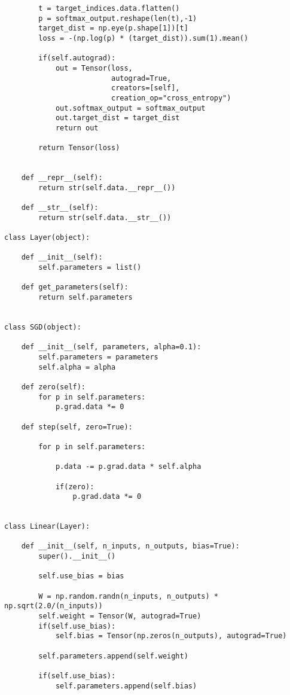 \documentclass[12pt]{article}
\begin{document}
\begin{verbatim}
        t = target_indices.data.flatten()
        p = softmax_output.reshape(len(t),-1)
        target_dist = np.eye(p.shape[1])[t]
        loss = -(np.log(p) * (target_dist)).sum(1).mean()
    
        if(self.autograd):
            out = Tensor(loss,
                         autograd=True,
                         creators=[self],
                         creation_op="cross_entropy")
            out.softmax_output = softmax_output
            out.target_dist = target_dist
            return out

        return Tensor(loss)
        
    
    def __repr__(self):
        return str(self.data.__repr__())
    
    def __str__(self):
        return str(self.data.__str__())  

class Layer(object):
    
    def __init__(self):
        self.parameters = list()
        
    def get_parameters(self):
        return self.parameters

    
class SGD(object):
    
    def __init__(self, parameters, alpha=0.1):
        self.parameters = parameters
        self.alpha = alpha
    
    def zero(self):
        for p in self.parameters:
            p.grad.data *= 0
        
    def step(self, zero=True):
        
        for p in self.parameters:
            
            p.data -= p.grad.data * self.alpha
            
            if(zero):
                p.grad.data *= 0


class Linear(Layer):

    def __init__(self, n_inputs, n_outputs, bias=True):
        super().__init__()
        
        self.use_bias = bias
        
        W = np.random.randn(n_inputs, n_outputs) * np.sqrt(2.0/(n_inputs))
        self.weight = Tensor(W, autograd=True)
        if(self.use_bias):
            self.bias = Tensor(np.zeros(n_outputs), autograd=True)
        
        self.parameters.append(self.weight)
        
        if(self.use_bias):        
            self.parameters.append(self.bias)


\end{verbatim}
\end{document}
